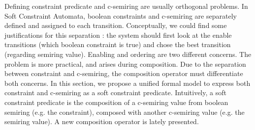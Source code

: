 Defining constraint predicate and c-semiring are usually orthogonal problems. In Soft Constraint Automata, boolean constraints and c-semiring are separately defined and assigned to each transition. Conceptually, we could find some justifications for this separation : the system should first look at the enable transitions (which boolean constraint is true) and chose the best transition (regarding semiring value). Enabling and ordering are two different concerns. The problem is more practical, and arises during composition. Due to the separation between constraint and c-semiring, the composition operator must differentiate both concerns. In this section, we propose a unified formal model to express both constraint and c-semiring as a soft constraint predicate. Intuitively, a soft constraint predicate is the composition of a c-semiring value from boolean semiring (e.g. the constraint), composed with another c-semiring value (e.g. the semiring value). A new composition operator is lately presented.



